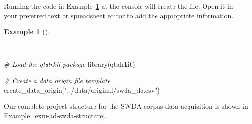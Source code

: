 \documentclass[
  letterpaper,
  DIV=11,
  numbers=noendperiod]{scrreport}
\newenvironment{Shaded}{\begin{snugshade}}{\end{snugshade}}
\newcommand{\CommentTok}[1]{\textcolor[rgb]{0.00,0.00,0.00}{\textit{#1}}}
\newcommand{\FunctionTok}[1]{\textcolor[rgb]{0.00,0.00,0.00}{#1}}
\newcommand{\NormalTok}[1]{\textcolor[rgb]{0.00,0.00,0.00}{#1}}
\newcommand{\StringTok}[1]{\textcolor[rgb]{0.00,0.00,0.00}{#1}}
\theoremstyle{definition}
\newtheorem{example}{Example}[chapter]
\theoremstyle{remark}
\begin{document}
Running the code in Example~\ref{exm-ad-swda-create-do} at the console
will create the file. Open it in your preferred text or spreadsheet
editor to add the appropriate information.

\begin{example}[]\protect\hypertarget{exm-ad-swda-create-do}{}\label{exm-ad-swda-create-do}

~

\begin{Shaded}
\begin{Highlighting}[]
\CommentTok{\# Load the \textasciigrave{}qtalrkit\textasciigrave{} package}
\FunctionTok{library}\NormalTok{(qtalrkit)}

\CommentTok{\# Create a data origin file template}
\FunctionTok{create\_data\_origin}\NormalTok{(}\StringTok{"../data/original/swda\_do.csv"}\NormalTok{)}
\end{Highlighting}
\end{Shaded}

\end{example}

Our complete project structure for the SWDA corpus data acquisition is
shown in Example~\ref{exm-ad-swda-structure}.
\end{document}
